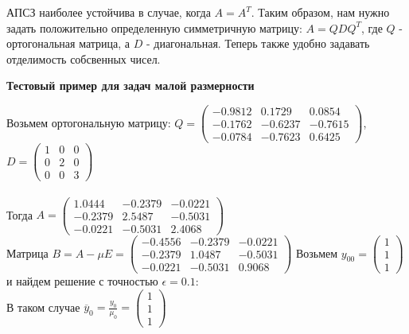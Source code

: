 \documentclass{article}
\begin{document}
	АПСЗ наиболее устойчива в случае, когда $A = A^T$. Таким образом, нам нужно задать положительно определенную симметричную матрицу: $A = QDQ^T$, где $Q$ - ортогональная матрица, а $D$ - диагональная. Теперь также удобно задавать отделимость собсвенных чисел.
	\begin{center} \textbf{Тестовый пример для задач малой размерности}\end{center}
	Возьмем ортогональную матрицу: $Q = \left(
	\begin{array}{ccc}
		-0.9812  &  0.1729  &  0.0854\\
		-0.1762  & -0.6237  & -0.7615\\
		-0.0784  & -0.7623  &  0.6425
	\end{array}
	\right)$, $D = \left(
	\begin{array}{ccc}
		1  &  0  &  0\\
		0  &  2  &  0\\
		0  &  0  &  3
	\end{array}
	\right)$\\
	\\
	Тогда $A = \left(
	\begin{array}{ccc}
		1.0444  & -0.2379  & -0.0221\\
		-0.2379  &  2.5487  & -0.5031\\
		-0.0221  & -0.5031  &  2.4068
	\end{array}
	\right)$\\
	Матрица $B = A - \mu E = \left(
	\begin{array}{ccc}
		-0.4556  & -0.2379  & -0.0221\\
		-0.2379  &  1.0487  & -0.5031\\
		-0.0221  & -0.5031  &  0.9068
	\end{array}
	\right)$
	Возьмем $y_00 = \left(
	\begin{array}{c}
		1\\
		1\\
		1
	\end{array}
	\right)$ и найдем решение с точностью $\epsilon = 0.1$:\\
	В таком случае $\overline{y}_0 = \frac{y_0}{\mu_0} = \left(
	\begin{array}{c}
		1\\
		1\\
		1
	\end{array}
	\right)$\\
\end{document}
